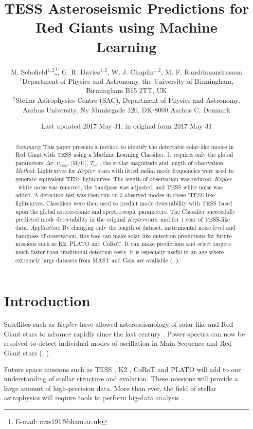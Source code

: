 \documentclass[a4paper,fleqn,usenatbib,useAMS]{mnras}
\title[TRG]{TESS Asteroseismic Predictions for Red Giants using Machine Learning}
\author[M. Schofield et al.]{M. Schofield$^{1, 2}$\thanks{E-mail: mxs191@bham.ac.uk}, G. R. Davies$^{1, 2}$, W. J. Chaplin$^{1, 2}$, M. F. Randrianandrasana
\\
$^{1}$Department of Physics and Astronomy, the University of Birmingham, Birmingham B15 2TT, UK \\
$^{2}$Stellar Astrophysics Centre (SAC), Department of Physics and Astronomy, Aarhus University, Ny Munkegade 120, DK-8000 Aarhus C, Denmark}
\date{Last updated 2017 May 31; in original form 2017 May 31}
\newcommand{\numax}{\ensuremath{\nu_{\textrm{max}}}}
\newcommand{\dnu}{\ensuremath{\Delta\nu}}
\newcommand{\teff}{\ensuremath{T_{\textrm{eff}}\:}}
\newcommand{\kep}{\ensuremath{Kepler}\:}
\begin{document}
\label{firstpage}
\pagerange{\pageref{firstpage}--\pageref{lastpage}}
\maketitle

\begin{abstract}
{\it Summary}: This paper presents a method to identify the detectable solar-like modes in Red Giant with TESS using a Machine Learning Classifier. It requires only the global parameters \dnu, \numax, [M/H], \teff, the stellar magnitude and length of observation. \newline
{\it Method}: Lightcurves for \kep \ stars with fitted radial mode frequencies were used to generate equivalent TESS lightcurves. The length of observation was reduced, \kep \ white noise was removed, the bandpass was adjusted, and TESS white noise was added. A detection test was then run on 3 observed modes in these 'TESS-like' lightcurves. Classifiers were then used to predict mode detectability with TESS based upon the global asteroseismic and spectroscopic parameters. The Classifier successfully predicted mode detectability in the original \kep stars, and for 1 year of TESS-like data.\newline
{\it Application}: By changing only the length of dataset, instrumental noise level and bandpass of observation, this tool can make solar-like detection predictions for future missions such as K2, PLATO and CoRoT. It can make predictions and select targets much faster than traditional detection tests. It is especially useful in an age where extremely large datasets from MAST and Gaia are available (\citet{eisenstein_sdss-iii:_2011}, \citet{gaia_collaboration_gaia_2016}).
\end{abstract}



\section{Introduction}

Satellites such as $Kepler$ have allowed asteroseismology of solar-like and Red Giant stars to advance rapidly since the last century \citet{chaplin_asteroseismology_2013}. Power spectra can now be resolved to detect individual modes of oscillation in Main Sequence and Red Giant stars (\citet{lund_standing_2017}, \citet{davies_asteroseismology_2016}).

Future space missions such as TESS \citep{ricker_transiting_2014}, K2 \citep{howell_k2_2014}, CoRoT \citep{baglin_corot:_2006} and PLATO \citep{rauer_plato_2014} will add to our understanding of stellar structure and evolution. These missions will provide a large amount of high-precision data. More than ever, the field of stellar astrophysics will require tools to perform big-data analysis \citep{kremer_big_2017}. 
\end{document}
